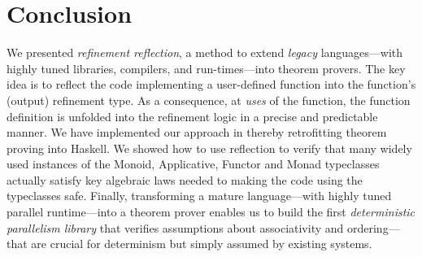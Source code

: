 \section{Conclusion}\label{sec:refinementreflection:conclusion}

We presented \emph{refinement reflection}, a method
to extend \emph{legacy} languages---with highly tuned
libraries, compilers, and run-times---into theorem provers.
%
The key idea is to reflect the ​code implementing a​
user-defined function into the function's (output)
refinement type.
%
As a consequence, at \emph{uses} of the function,
the function definition is unfolded into the refinement logic
in a precise and predictable manner.
%
We have implemented our approach in \toolname
thereby retrofitting theorem proving into Haskell.
%
We showed how to use reflection to verify
that many widely used instances of the Monoid,
Applicative, Functor and Monad typeclasses
actually satisfy key algebraic laws needed to
making the code using the typeclasses safe.
%
Finally, transforming a mature language---with
highly tuned parallel runtime---into a theorem
prover  enables us to build the first
\emph{deterministic parallelism library}
that verifies assumptions about associativity
and ordering---that are crucial for determinism
but simply assumed by existing systems.

\begin{comment}
Our evaluation shows that refinement reflection
lets us prove deep specifications of a variety
of implementations, but identifies
important avenues for research.
%
First, while proofs are \emph{possible}, they can
sometimes be \emph{cumbersome}. For example, in
the proof of associativity of the monadic bind
operator for the @Reader@ monad three of eight
(extensional) equalities required explanations,
some nested under multiple $\lambda$-abstractions.
%
Thus, it would be valuable to use recent
advances in refinement-based synthesis~\cite{polikarpova16}
to automate proof construction.
%
Second, while our approach to $\alpha$- and
$\beta$-equivalence is sound, we do not know
if it is \emph{complete}. We conjecture it is,
due to the fact that our refinement terms
are from the simply typed lambda calculus (STLC).
%
Thus, it would be interesting to use the
normalization of STLC to develop a sound
and complete SMT axiomatization, thereby
automating proofs predictably.
\end{comment}